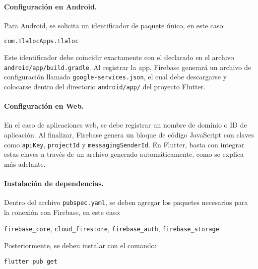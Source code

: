 \vspace{1em}

\paragraph{Configuración en Android.}  
Para Android, se solicita un identificador de paquete único, en este caso:

\begin{center}
  \texttt{com.TlalocApps.tlaloc}
\end{center}

Este identificador debe coincidir exactamente con el declarado en el archivo \texttt{android/app/build.gradle}. Al registrar la app, Firebase generará un archivo de configuración llamado \texttt{google-services.json}, el cual debe descargarse y colocarse dentro del directorio \texttt{android/app/} del proyecto Flutter.

\vspace{1em}

\paragraph{Configuración en Web.}  
En el caso de aplicaciones web, se debe registrar un nombre de dominio o ID de aplicación. Al finalizar, Firebase genera un bloque de código JavaScript con claves como \texttt{apiKey}, \texttt{projectId} y \texttt{messagingSenderId}. En Flutter, basta con integrar estas claves a través de un archivo generado automáticamente, como se explica más adelante.

\vspace{1em}

\paragraph{Instalación de dependencias.}  
Dentro del archivo \texttt{pubspec.yaml}, se deben agregar los paquetes necesarios para la conexión con Firebase, en este caso:

\begin{center}
  \texttt{firebase\_core}, \quad
  \texttt{cloud\_firestore}, \quad
  \texttt{firebase\_auth}, \quad
  \texttt{firebase\_storage}
\end{center}

Posteriormente, se deben instalar con el comando:

\begin{center}
  \texttt{flutter pub get}
\end{center}

